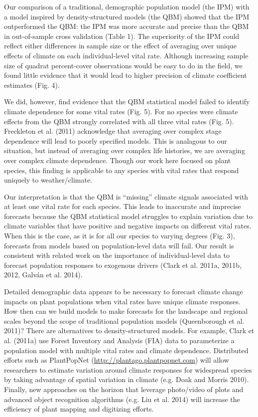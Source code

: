 \documentclass[12pt,]{article}
\begin{document}
Our comparison of a traditional, demographic population model (the IPM)
with a model inspired by density-structured models (the QBM) showed that
the IPM outperformed the QBM: the IPM was more accurate and precise than
the QBM in out-of-sample cross validation (Table 1). The superiority of
the IPM could reflect either differences in sample size or the effect of
averaging over unique effects of climate on each individual-level vital
rate. Although increasing sample size of quadrat percent-cover
observations would be easy to do in the field, we found little evidence
that it would lead to higher precision of climate coefficient estimates
(Fig. 4).

We did, however, find evidence that the QBM statistical model failed to
identify climate dependence for some vital rates (Fig. 5). For no
species were climate effects from the QBM strongly correlated with all
three vital rates (Fig. 5). Freckleton et al. (2011) acknowledge that
averaging over complex stage dependence will lead to poorly specified
models. This is analagous to our situation, but instead of averaging
over complex life histories, we are averaging over complex climate
dependence. Though our work here focused on plant species, this finding
is applicable to any species with vital rates that respond uniquely to
weather/climate.

Our interpretation is that the QBM is ``missing'' climate signals
associated with at least one vital rate for each species. This leads to
inaccurate and imprecise forecasts because the QBM statistical model
struggles to explain variation due to climate variables that have
positive and negative impacts on different vital rates. When this is the
case, as it is for all our species to varying degrees (Fig. 3),
forecasts from models based on population-level data will fail. Our
result is consistent with related work on the importance of
individual-level data to forecast population responses to exogenous
drivers (Clark et al. 2011a, 2011b, 2012, Galv{á}n et al. 2014).

Detailed demographic data appears to be necessary to forecast climate
change impacts on plant populations when vital rates have unique climate
responses. How then can we build models to make forecasts for the
landscape and regional scales beyond the scope of traditional population
models (Queenborough et al. 2011)? There are alternatives to
density-structured models. For example, Clark et al. (2011a) use Forest
Inventory and Analysis (FIA) data to parameterize a population model
with multiple vital rates and climate dependence. Distributed efforts
such as PlantPopNet (\url{http://plantago.plantpopnet.com}) will allow
researchers to estimate variation around climate responses for
widespread species by taking advantage of spatial variation in climate
(e.g. Doak and Morris 2010). Finally, new approaches on the horizon that
leverage photo/video of plots and advanced object recognition algorithms
(e.g. Liu et al. 2014) will increase the efficiency of plant mapping and
digitizing efforts.
\end{document}
